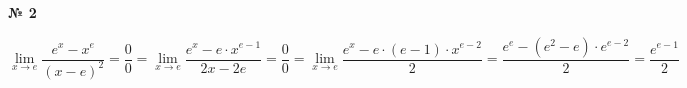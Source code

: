 \documentclass{article}
\begin{document}
\textbf{№ 2} 

$$ \lim\limits_{x \to e} \frac{e^x-x^e}{(x-e)^2} 
= \frac{0}{0} 
= \lim\limits_{x \to e} \frac{e^x - e \cdot x^{e-1}}{2x-2e}
= \frac{0}{0} 
= \lim\limits_{x \to e} \frac{e^x - e \cdot (e-1) \cdot x^{e-2}}{2} 
= \frac{e^e - (e^2-e) \cdot e^{e-2}}{2} 
= \frac{e^{e-1}}{2} $$
\end{document}
